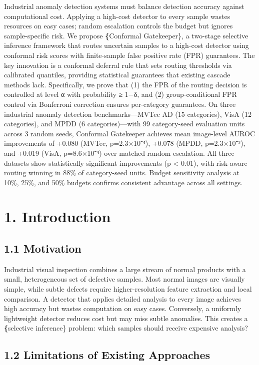 \documentclass[10pt]{article}
\begin{document}
Industrial anomaly detection systems must balance detection accuracy against computational cost. Applying a high-cost detector to every sample wastes resources on easy cases; random escalation controls the budget but ignores sample-specific risk. We propose \textbf\{Conformal Gatekeeper\}, a two-stage selective inference framework that routes uncertain samples to a high-cost detector using conformal risk scores with finite-sample false positive rate (FPR) guarantees. The key innovation is a conformal deferral rule that sets routing thresholds via calibrated quantiles, providing statistical guarantees that existing cascade methods lack. Specifically, we prove that (1) the FPR of the routing decision is controlled at level α with probability ≥ 1−δ, and (2) group-conditional FPR control via Bonferroni correction ensures per-category guarantees. On three industrial anomaly detection benchmarks—MVTec AD (15 categories), VisA (12 categories), and MPDD (6 categories)—with 99 category-seed evaluation units across 3 random seeds, Conformal Gatekeeper achieves mean image-level AUROC improvements of +0.080 (MVTec, p=2.3×10⁻⁴), +0.078 (MPDD, p=2.3×10⁻³), and +0.019 (VisA, p=8.6×10⁻⁴) over matched random escalation. All three datasets show statistically significant improvements (p < 0.01), with risk-aware routing winning in 88\% of category-seed units. Budget sensitivity analysis at 10\%, 25\%, and 50\% budgets confirms consistent advantage across all settings.

\section{1. Introduction}

\subsection{1.1 Motivation}

Industrial visual inspection combines a large stream of normal products with a small, heterogeneous set of defective samples. Most normal images are visually simple, while subtle defects require higher-resolution feature extraction and local comparison. A detector that applies detailed analysis to every image achieves high accuracy but wastes computation on easy cases. Conversely, a uniformly lightweight detector reduces cost but may miss subtle anomalies. This creates a \textbf\{selective inference\} problem: which samples should receive expensive analysis?

\subsection{1.2 Limitations of Existing Approaches}
\end{document}
